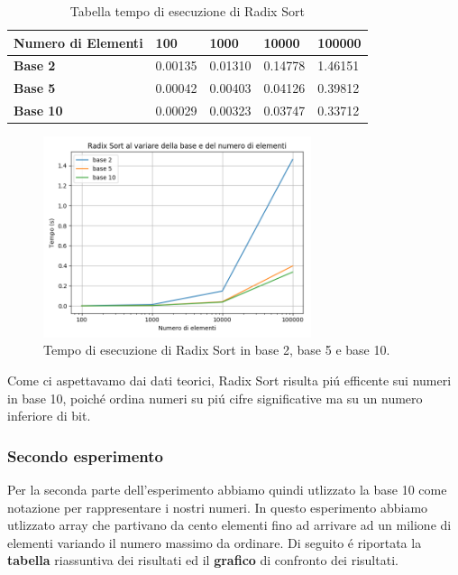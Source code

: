 \documentclass[a4paper]{article}
\begin{document}
\begin{center}
\begin{table}[h!]
\centering
\begin{tabular}{|l|l|l|l|l|}
\hline
\textbf{Numero di Elementi} & \textbf{100} & \textbf{1000} & \textbf{10000} & \textbf{100000}\\
\hline
\textbf{Base 2} & 0.00135 & 0.01310 & 0.14778 & 1.46151\\
\hline
\textbf{Base 5} & 0.00042 & 0.00403 & 0.04126 & 0.39812\\
\hline
\textbf{Base 10} & 0.00029 & 0.00323 & 0.03747 & 0.33712\\
\hline
\end{tabular}
\caption{Tabella tempo di esecuzione di Radix Sort}
\end{table}
\end{center}


\begin{figure}[h]
    \centering
    \captionsetup{justification=centering,margin=1.0cm}
    \includegraphics[width=0.7\textwidth]{RS_Basi}
    \caption{Tempo di esecuzione di Radix Sort in base 2, base 5 e base 10.}
    \label{fig:test2_1}
\end{figure}

Come ci aspettavamo dai dati teorici, Radix Sort risulta pi\'u efficente sui numeri in base 10, poich\'e ordina numeri su pi\'u cifre significative ma su un numero inferiore di bit.

\subsubsection{Secondo esperimento}
Per la seconda parte dell'esperimento abbiamo quindi utlizzato la base 10 come notazione per rappresentare i nostri numeri. In questo esperimento abbiamo utlizzato array che partivano da cento elementi fino ad arrivare ad un milione di elementi variando il numero massimo da ordinare. 
\newline
Di seguito \'e riportata la \textbf{tabella} riassuntiva dei risultati ed il \textbf{grafico} di confronto dei risultati.
\clearpage
\end{document}

